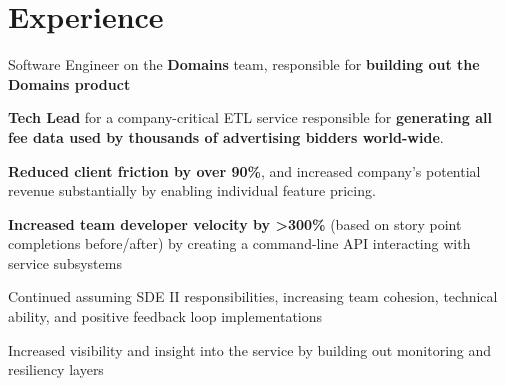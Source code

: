 \documentclass[]{two-column-resume}
\begin{document}
\hfill
\begin{minipage}[t]{0.65\textwidth} 

\section{Experience}


 \vspace{\topsep} %
 
\begin{tightemize}
\item Software Engineer on the \textbf{Domains} team,
responsible for \textbf{building out the Domains product}
\end{tightemize}
\sectionsep


 \vspace{\topsep} %
 
\begin{tightemize}
\item {\bf Tech Lead} for a company-critical ETL service responsible
for {\bf generating all fee data used by thousands of advertising bidders world-wide}.
\item {\bf Reduced client friction by over 90\%}, and increased
company's potential revenue substantially by enabling individual feature pricing.
\item {\bf Increased team developer velocity by >300\%} (based on story point
completions before/after) by creating a command-line API interacting
with service subsystems
\item Continued assuming SDE II responsibilities, increasing team cohesion,
technical ability, and positive feedback loop implementations
\item Increased visibility and insight into the service by building out monitoring and resiliency layers
\end{tightemize}
\sectionsep


\end{minipage}
\end{document}
